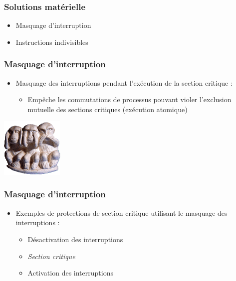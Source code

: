 \begin{frame}
\frametitle{Solutions matérielle}
\begin{itemize}
\item Masquage d’interruption
\item Instructions indivisibles
\end{itemize}
\end{frame}

\begin{frame}
\frametitle{Masquage d’interruption}
\begin{itemize}
\item Masquage des interruptions pendant l’exécution de la section critique :
\begin{itemize}
\item Empêche les commutations de processus pouvant violer l'exclusion mutuelle des sections critiques (exécution atomique)
\end{itemize}
\end{itemize}
\begin{center}
\includegraphics[width=3cm]{../illustration/singes.png}
\end{center}
\end{frame}

\begin{frame}
\frametitle{Masquage d’interruption}
\begin{itemize}
\item Exemples de protections de section critique utilisant le masquage des interruptions :
\begin{itemize}
\item Désactivation des interruptions
\item \textit{Section critique}
\item Activation des interruptions
\end{itemize}
\end{itemize}
\end{frame}

